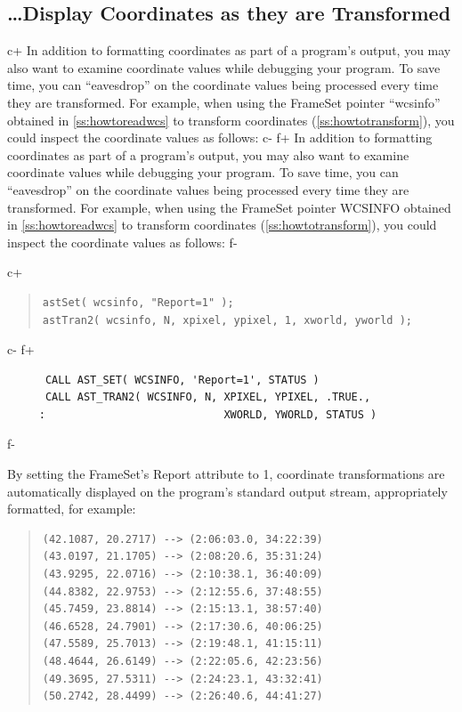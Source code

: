 \documentclass[twoside,11pt]{article}
\newcommand{\secref}[1]{\S\ref{#1}}
\renewcommand{\secref}[1]{\ref{#1}}
\begin{document}
\subsection{\ldots Display Coordinates as they are Transformed}

c+
In addition to formatting coordinates as part of a program's output,
you may also want to examine coordinate values while debugging your
program. To save time, you can ``eavesdrop'' on the coordinate values
being processed every time they are transformed. For example, when
using the FrameSet pointer ``wcsinfo'' obtained in
\secref{ss:howtoreadwcs} to transform coordinates
(\secref{ss:howtotransform}), you could inspect the coordinate values
as follows:
c-
f+
In addition to formatting coordinates as part of a program's output,
you may also want to examine coordinate values while debugging your
program. To save time, you can ``eavesdrop'' on the coordinate values
being processed every time they are transformed. For example, when
using the FrameSet pointer WCSINFO obtained in
\secref{ss:howtoreadwcs} to transform coordinates
(\secref{ss:howtotransform}), you could inspect the coordinate values
as follows:
f-

c+
\begin{quote}
\small
\begin{verbatim}
astSet( wcsinfo, "Report=1" );
astTran2( wcsinfo, N, xpixel, ypixel, 1, xworld, yworld );
\end{verbatim}
\normalsize
\end{quote}
c-
f+
\small
\begin{verbatim}
      CALL AST_SET( WCSINFO, 'Report=1', STATUS )
      CALL AST_TRAN2( WCSINFO, N, XPIXEL, YPIXEL, .TRUE.,
     :                            XWORLD, YWORLD, STATUS )
\end{verbatim}
\normalsize
f-

By setting the FrameSet's Report attribute to 1, coordinate
transformations are automatically displayed on the program's standard
output stream, appropriately formatted, for example:

\begin{quote}
\begin{verbatim}
(42.1087, 20.2717) --> (2:06:03.0, 34:22:39)
(43.0197, 21.1705) --> (2:08:20.6, 35:31:24)
(43.9295, 22.0716) --> (2:10:38.1, 36:40:09)
(44.8382, 22.9753) --> (2:12:55.6, 37:48:55)
(45.7459, 23.8814) --> (2:15:13.1, 38:57:40)
(46.6528, 24.7901) --> (2:17:30.6, 40:06:25)
(47.5589, 25.7013) --> (2:19:48.1, 41:15:11)
(48.4644, 26.6149) --> (2:22:05.6, 42:23:56)
(49.3695, 27.5311) --> (2:24:23.1, 43:32:41)
(50.2742, 28.4499) --> (2:26:40.6, 44:41:27)
\end{verbatim}
\end{quote}
\end{document}
